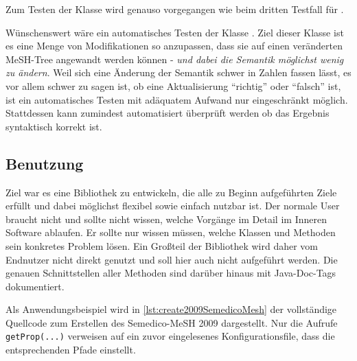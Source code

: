 Zum Testen der Klasse  wird genauso vorgegangen wie beim dritten Testfall für . \par

Wünschenswert wäre ein automatisches Testen der Klasse . Ziel dieser Klasse ist es eine Menge von Modifikationen so anzupassen, dass sie auf einen veränderten MeSH-Tree angewandt werden können - \textit{und dabei die Semantik möglichst wenig zu ändern}. Weil sich eine Änderung der Semantik schwer in Zahlen fassen lässt, es vor allem schwer zu sagen ist, ob eine Aktualisierung "`richtig"' oder "`falsch"' ist, ist ein automatisches Testen mit adäquatem Aufwand nur eingeschränkt möglich. Stattdessen kann zumindest automatisiert überprüft werden ob das Ergebnis syntaktisch korrekt ist. \par 

\subsection{Benutzung}
Ziel war es eine Bibliothek zu entwickeln, die alle zu Beginn aufgeführten Ziele erfüllt und dabei möglichst flexibel sowie einfach nutzbar ist. Der normale User braucht nicht und sollte nicht wissen, welche Vorgänge im Detail im Inneren Software ablaufen. Er sollte nur wissen müssen, welche Klassen und Methoden sein konkretes Problem lösen. Ein Großteil der Bibliothek wird daher vom Endnutzer nicht direkt genutzt und soll hier auch nicht aufgeführt werden. Die genauen Schnittstellen aller Methoden sind darüber hinaus mit Java-Doc-Tags dokumentiert. \par
Als Anwendungsbeispiel wird in \autoref{lst:create2009SemedicoMesh} der vollständige Quellcode zum Erstellen des Semedico-MeSH 2009 dargestellt. Nur die Aufrufe \lstinline|getProp(...)| verweisen auf ein zuvor eingelesenes Konfigurationsfile, dass die entsprechenden Pfade einstellt.\par

